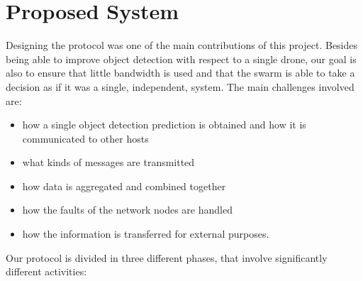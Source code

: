 \documentclass[10pt,conference,compsocconf]{IEEEtran}
\begin{document}
\section{Proposed System}
\label{sec:design}
Designing the protocol was one of the main contributions of this project. Besides being able to improve object detection with respect to a single drone, our goal is also to ensure that little bandwidth is used and that the swarm is able to take a decision as if it was a single, independent, system. The main challenges involved are:
\begin{itemize}
\item how a single object detection prediction is obtained and how it is communicated to other hosts
\item what kinds of messages are transmitted
\item how data is aggregated and combined together
\item how the faults of the network nodes are handled
\item how the information is transferred for external purposes.
\end{itemize}
Our protocol is divided in three different phases, that involve significantly different activities:
\end{document}
